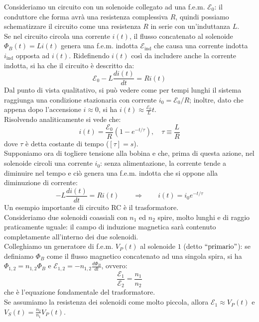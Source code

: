 \documentclass[]{article}
\newcommand{\E}{\mathcal{E}}
\begin{document}
Consideriamo un circuito con un solenoide collegato ad una f.e.m. $ \E_0 $: il conduttore che forma avrà una resistenza complessiva $ R $, quindi possiamo schematizzare il circuito come una resistenza $ R $ in serie con un'induttanza $ L $. \\ 
Se nel circuito circola una corrente $ i(t) $, il flusso concatenato al solenoide $ \Phi_B(t) = Li(t) $ genera una f.e.m. indotta $ \E_{\text{ind}} $ che causa una corrente indotta $ i_{\text{ind}} $ opposta ad $ i(t) $. Ridefinendo $ i(t) $ così da includere anche la corrente indotta, si ha che il circuito è descritto da:
\begin{equation}
	\E_0 - L \frac{di(t)}{dt} = Ri(t)
	\label{eq:29}
\end{equation}
Dal punto di vista qualitativo, si può vedere come per tempi lunghi il sistema raggiunga una condizione stazionaria con corrente $ i_0 = \E_0 / R $; inoltre, dato che appena dopo l'accensione $ i \approx 0 $, si ha $ i(t) \approx \frac{\E_0}{L} t $. \\ 
%
Risolvendo analiticamente si vede che:
\begin{equation}
	i(t) = \frac{\E_0}{R} (1 - e^{-t/\tau}), \quad \tau \equiv \frac{L}{R}
	\label{eq:30}
\end{equation}
dove $ \tau $ è detta costante di tempo ($ [\tau] = s $). \\ 
%
Supponiamo ora di togliere tensione alla bobina e che, prima di questa azione, nel solenoide circoli una corrente $ i_0 $: senza alimentazione, la corrente tende a diminuire nel tempo e ciò genera una f.e.m. indotta che si oppone alla diminuzione di corrente:
\begin{equation}
	-L \frac{di(t)}{dt} = Ri(t) \qquad\Longrightarrow\qquad i(t) = i_0 e^{-t/\tau}
	\label{eq:31}
\end{equation}
%
Un esempio importante di circuito RC è il trasformatore. \\ 
%
Consideriamo due solenoidi coassiali con $ n_1 $ ed $ n_2 $ spire, molto lunghi e di raggio praticamente uguale: il campo di induzione magnetica sarà contenuto completamente all'interno dei due solenoidi. \\ 
%
Colleghiamo un generatore di f.e.m. $ V_P(t) $ al solenoide $ 1 $ (detto $ ``\text{primario}" $): se definiamo $ \Phi_B $ come il flusso magnetico concatenato ad una singola spira, si ha $ \Phi_{1,2} = n_{1,2} \Phi_B $ e $ \E_{1,2} = - n_{1,2} \frac{d\Phi_B}{dt} $, ovvero:
\begin{equation}
	\frac{\E_1}{\E_2} = \frac{n_1}{n_2}
	\label{eq:32}
\end{equation}
che è l'equazione fondamentale del trasformatore. \\ 
%
Se assumiamo la resistenza dei solenoidi come molto piccola, allora $ \E_1 \approx V_P(t) $ e $ V_S(t) = \frac{n_2}{n_1}V_P(t) $.
\end{document}
